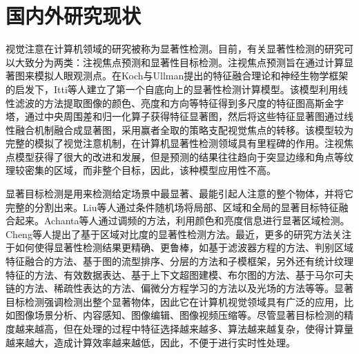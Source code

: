 \section{国内外研究现状}
\label{1_2}

视觉注意在计算机领域的研究被称为显著性检测。目前，有关显著性检测的研究可以大致分为两类：注视焦点预测和显著性目标检测\cite{ChengMingMingCVPR2014BING,LiYinCVPR2014Secrets}。注视焦点预测旨在通过计算显著图来模拟人眼观测点。在Koch与Ullman\cite{Koch1987Shifts}提出的特征融合理论和神经生物学框架的启发下，Itti等人\cite{IttiTPAMI1998Model}建立了第一个自底向上的显著性检测计算模型。该模型利用线性滤波的方法提取图像的颜色、亮度和方向等特征得到多尺度的特征图高斯金字塔，通过中央周围差和归一化算子获得特征显著图，然后将这些特征显著图通过线性融合机制融合成显著图，采用赢者全取的策略支配视觉焦点的转移。该模型较为完整的模拟了视觉注意机制，在计算机显著性检测领域具有里程碑的作用。注视焦点模型获得了很大的改进和发展\cite{JuddMIT2012Benchmark,BorjiTIP2013Quantitative,BorjiICCV2013Analysis,BorjiTPAMI2013State,VigCVPR2014Large}，但是预测的结果往往趋向于突显边缘和角点等纹理较密集的区域，而非整个目标，因此，该种模型应用性不高\cite{ChengMingMingCVPR2014BING}。

显著目标检测是用来检测给定场景中最显著、最能引起人注意的整个物体，并将它完整的分割出来\cite{BorjiECCV2012Salient,LiYinCVPR2014Secrets}。Liu等人\cite{LiuTieCVPR2007Learning}通过条件随机场将局部、区域和全局的显著目标特征融合起来。Achanta等人\cite{AchantaCVPR2009Frequency}通过调频的方法，利用颜色和亮度信息进行显著区域检测。Cheng等人\cite{ChengMingMingCVPR2011Global}提出了基于区域对比度的显著性检测方法。最近，更多的研究方法\cite{BorjiECCV2012Salient}关注于如何使得显著性检测结果更精确、更鲁棒，如基于滤波器方程的方法\cite{PerazziCVPR2012filters}、判别区域特征融合的方法\cite{JiangHuaizuCVPR2013Discriminative}、基于图的流型排序\cite{YangChuanCVPR2013Manifold}、分层的方法\cite{YanQiongCVPR2013Hierarchical}和子模框架\cite{JiangZhuolinCVPR2013Submodular}，另外还有统计纹理特征的方法\cite{ScharfenbergerCVPR2013Statistical}、有效数据表达\cite{ChengMingMingICCV2013Efficient}、基于上下文超图建模\cite{LiXiICCV2013Contextual}、布尔图的方法\cite{ZhangJianmingICCV2013Boolean}、基于马尔可夫链的方法\cite{JiangBowenICCV2013Markov}、稀疏性表达的方法\cite{LiXiaohuiICCV2013Dense}、偏微分方程学习的方法\cite{LiuRishengCVPR2014Adaptive}以及光场的方法\cite{LiNianyiCVPR2014Light}等等。显著目标检测强调检测出整个显著物体，因此它在计算机视觉领域具有广泛的应用\cite{BorjiTPAMI2013State}，比如图像场景分析、内容感知、图像编辑、图像视频压缩等。尽管显著目标检测的精度越来越高，但在处理的过程中特征选择越来越多、算法越来越复杂，使得计算量越来越大，造成计算效率越来越低，因此，不便于进行实时性处理。

